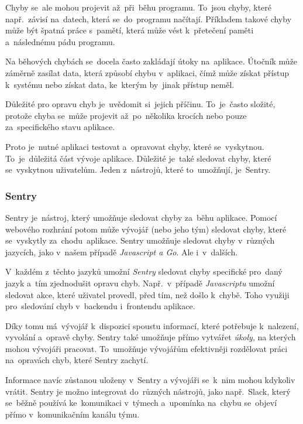 \documentclass[14pt,a4paper]{article}
\begin{document}
            Chyby se~ale mohou projevit až~při~běhu programu. To~jsou chyby, které např.~závisí na~datech, která se~do~programu načítají.
            Příkladem takové chyby může být špatná práce s~pamětí, která může vést k~přetečení paměti a~následnému pádu programu.

            Na běhových chybách se~docela často zakládají útoky na~aplikace. Útočník může záměrně zasílat data, která způsobí chybu v~aplikaci,
            čímž může získat přístup k~systému nebo získat data, ke~kterým by~jinak přístup neměl.

            Důležité pro opravu chyb je~uvědomit si~jejich příčinu. To~je~často složité, protože chyba se~může projevit až~po~několika krocích nebo pouze za~specifického stavu aplikace.

            Proto je~nutné aplikaci testovat a~opravovat chyby, které se~vyskytnou. To~je~důležitá část vývoje aplikace. Důležité je~také sledovat
            chyby, které se~vyskytnou uživatelům. Jeden z~nástrojů, které to~umožňují, je~Sentry.

            \subsubsection{Sentry}
            Sentry je~nástroj, který umožňuje sledovat chyby za~běhu aplikace.
            Pomocí webového rozhrání potom může vývojář (nebo jeho tým) sledovat chyby, které se~vyskytly za~chodu~aplikace.
            Sentry umožňuje sledovat chyby v~různých jazycích, jako v~našem případě \emph{Javascript a Go}. Ale i~v~dalších.


            V~každém z~těchto jazyků umožní \emph{Sentry} sledovat chyby specifické pro~daný jazyk a~tím zjednodušit opravu chyb.
            Např.~v~případě \emph{Javascriptu} umožní sledovat akce, které uživatel provedl, před tím, než došlo k~chybě. 
            Toho využiji pro~sledování chyb v~backendu i~frontendu aplikace.

            Díky tomu má~vývojář k~dispozici spoustu informací, které potřebuje k~nalezení, vyvolání a~opravě chyby.
            Sentry také umožňuje přímo vytvářet \emph{úkoly}, na kterých mohou vývojáři pracovat.
            To~umožňuje vývojářům efektivněji rozdělovat práci na~opravách chyb, které Sentry zachytí.

            Informace navíc zůstanou uloženy v~Sentry a vývojáři se~k~nim mohou kdykoliv vrátit.
            Sentry je možno integrovat do~různých nástrojů, jako např.~Slack, který se~běžně používá ke~komunikaci v~týmech
            a~upomínka na~chybu se~objeví přímo v~komunikačním kanálu týmu.
	
\end{document}
